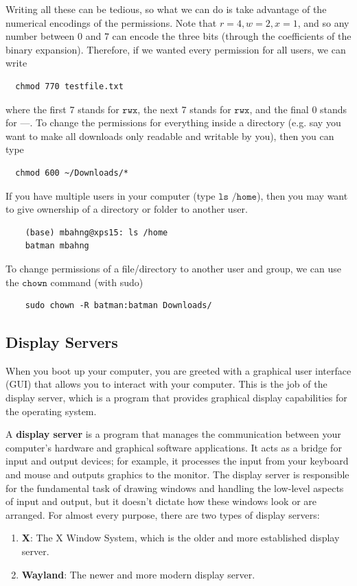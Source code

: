   Writing all these can be tedious, so what we can do is take advantage of the numerical encodings of the permissions. Note that $r=4, w=2, x=1$, and so any number between $0$ and $7$ can encode the three bits (through the coefficients of the binary expansion). Therefore, if we wanted every permission for all users, we can write 
  \begin{lstlisting}
  chmod 770 testfile.txt
  \end{lstlisting}
  where the first 7 stands for $\texttt{rwx}$, the next 7 stands for $\texttt{rwx}$, and the final $0$ stands for $\texttt{---}$. To change the permissions for everything inside a directory (e.g. say you want to make all downloads only readable and writable by you), then you can type 
  \begin{lstlisting}
  chmod 600 ~/Downloads/*
  \end{lstlisting}

  If you have multiple users in your computer (type $\texttt{ls /home}$), then you may want to give ownership of a directory or folder to another user. 
  \begin{lstlisting}
    (base) mbahng@xps15: ls /home
    batman mbahng
  \end{lstlisting}
  To change permissions of a file/directory to another user and group, we can use the $\texttt{chown}$ command (with sudo) 
  \begin{lstlisting}
    sudo chown -R batman:batman Downloads/
  \end{lstlisting}

\subsection{Display Servers}

  When you boot up your computer, you are greeted with a graphical user interface (GUI) that allows you to interact with your computer. This is the job of the display server, which is a program that provides graphical display capabilities for the operating system. 

  \begin{definition}
    A \textbf{display server} is a program that manages the communication between your computer's hardware and graphical software applications. It acts as a bridge for input and output devices; for example, it processes the input from your keyboard and mouse and outputs graphics to the monitor. The display server is responsible for the fundamental task of drawing windows and handling the low-level aspects of input and output, but it doesn't dictate how these windows look or are arranged. For almost every purpose, there are two types of display servers: 
    \begin{enumerate} 
      \item \textbf{X}: The X Window System, which is the older and more established display server. 
      \item \textbf{Wayland}: The newer and more modern display server.
    \end{enumerate}
  \end{definition}

